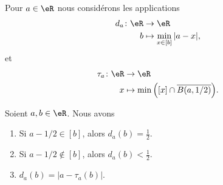 \begin{definition}	\label{DEFooPXMUooTOQCLa}
	Pour \( a\in \eR\) nous considérons les applications
	\begin{equation}
		\begin{aligned}
			d_a\colon \eR & \to \eR                         \\
			b             & \mapsto \min_{x\in [b]}| a-x |,
		\end{aligned}
	\end{equation}
	et
	\begin{equation}
		\begin{aligned}
			\tau_a\colon \eR & \to \eR                                               \\
			x                & \mapsto \min \Big( [x]\cap \overline{B(a,1/2)} \Big).
		\end{aligned}
	\end{equation}
\end{definition}

\begin{lemma}	\label{LEMooRMLSooNOKXkQ}
	Soient \( a,b\in \eR\). Nous avons
	\begin{enumerate}
		\item		\label{ITEMooHRISooLsqKqd}
		      Si \( a-1/2\in[b]\), alors \( d_a(b)=\frac{ 1 }{2}\).
		\item	\label{ITEMooXMNYooKQYaee}
		      Si \( a-1/2\not\in[b]\), alors \( d_a(b)<\frac{ 1 }{2}\).
		\item	\label{ITEMooMUCXooBWrRMz}
		      \( d_a(b)=| a-\tau_a(b) |\).
	\end{enumerate}
\end{lemma}

